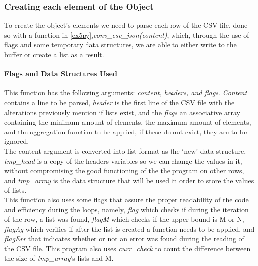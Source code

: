 \documentclass[11pt,a4paper,times]{report}
\begin{document}
\subsubsection*{Creating each element of the Object}
To create the object's elements we need to parse each row of the CSV file,
done so with a function in \ref{ex5py},\textit{conv\_csv\_json(content)}, which,
through the use of flags and some temporary data structures, we are able to
either write to the buffer or create a list as a result.
\paragraph*{Flags and Data Structures Used} This function has the following
arguments: \textit{content, headers, and flags}. \textit{Content} contains
a line to be parsed, \textit{header} is the first line of the CSV file with the alterations
previously mention if lists exist, and the \textit{flags} an associative array
containing the minimum amount of elements, the maximum amount of elements,
and the aggregation function to be applied, if these do not exist,
they are to be ignored.\\
The content argument is converted into list format as the `new' data structure,
\textit{tmp\_head} is a copy of the headers variables so we can change the values in it,
without compromising the good functioning of the the program on other rows,
and \textit{tmp\_array} is the data structure that will be used in order to store the values
of lists.\\
This function also uses some flags that assure the proper readability of the code
and efficiency during the loops, namely, \textit{flag} which checks if during the iteration
of the row, a list was found, \textit{flagM} which checks if the upper bound is M or N,
\textit{flagAg} which verifies if after the list is created a function needs to be applied,
and \textit{flagErr} that indicates whether or not an error was found during the reading
of the CSV file. This program also uses \textit{curr\_check} to count the difference
between the size of \textit{tmp\_array}'s lists and M.
\end{document}
